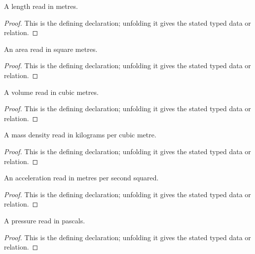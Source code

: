 \begin{definition}[LengthSI]
  \label{decl:physics:IPhO_2026_1_A_1:LengthSI}
  A length read in metres.
\end{definition}
\begin{proof}
  This is the defining declaration; unfolding it gives the stated typed data or relation.
\end{proof}

\begin{definition}[AreaSI]
  \label{decl:physics:IPhO_2026_1_A_1:AreaSI}
  An area read in square metres.
\end{definition}
\begin{proof}
  This is the defining declaration; unfolding it gives the stated typed data or relation.
\end{proof}

\begin{definition}[VolumeSI]
  \label{decl:physics:IPhO_2026_1_A_1:VolumeSI}
  A volume read in cubic metres.
\end{definition}
\begin{proof}
  This is the defining declaration; unfolding it gives the stated typed data or relation.
\end{proof}

\begin{definition}[MassDensitySI]
  \label{decl:physics:IPhO_2026_1_A_1:MassDensitySI}
  A mass density read in kilograms per cubic metre.
\end{definition}
\begin{proof}
  This is the defining declaration; unfolding it gives the stated typed data or relation.
\end{proof}

\begin{definition}[AccelerationSI]
  \label{decl:physics:IPhO_2026_1_A_1:AccelerationSI}
  An acceleration read in metres per second squared.
\end{definition}
\begin{proof}
  This is the defining declaration; unfolding it gives the stated typed data or relation.
\end{proof}

\begin{definition}[PressureSI]
  \label{decl:physics:IPhO_2026_1_A_1:PressureSI}
  A pressure read in pascals.
\end{definition}
\begin{proof}
  This is the defining declaration; unfolding it gives the stated typed data or relation.
\end{proof}

